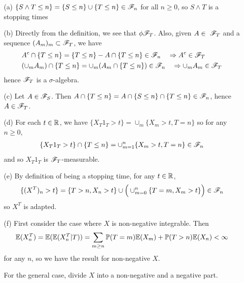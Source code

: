 \documentclass[10pt,a4paper]{report}
\newenvironment{proof}
{\begin{changemargin}{1cm}{0.5cm} 
	}%
	{\end{changemargin}
}
\begin{document}
\begin{proof}
\pf
\begin{itemize}
\item[(a)] $\{ S \wedge T \leq n \} = \{S  \leq n \} \cup \{ T \leq n\} \in \mathscr{F}_n$ for all $n\geq 0$, so $S\wedge T$ is a stopping times

\item[(b)] Directly from the definition, we see that $\phi \mathscr{F}_T$. Also, given $A\in \ \mathscr{F}_T$ and a sequence $(A_m)_m \subset \mathscr{F}_T$, we have
\begin{align*}
& A^c \cap \{T\leq n \} = \{T\leq n\} - A \cap \{T\leq n \} \in \mathscr{F}_n \quad \Rightarrow  A^c \in \mathscr{F}_T \\
&(\cup_m A_m) \cap \{T\leq n\} =  \cup_m (A_m \cap \{T\leq n\}) \in \mathscr{F}_n \quad \Rightarrow \cup_m A_m \in \mathscr{F}_T
\end{align*}
hence $\mathscr{F}_T$ is a $\sigma$-algebra.

\item[(c)] Let $A\in \mathscr{F}_S$. Then $A\cap \{T\leq n\} = A \cap \{S\leq n\} \cap \{T \leq n\} \in \mathscr{F}_n$, hence $A \in \mathscr{F}_T$.

\item[(d)] For each $t\in \mathbb{R}$, we have $\{X_T 1_T >t \} = \cup_m \{X_m >t, T=n \}$ so for any $n\geq 0$,
\begin{align*}
\{X_T 1_T >t \} \cap \{T\leq n\} = \cup_{m=1}^n \{X_m >t, T=n \} \in \mathscr{F}_n
\end{align*}
and so $X_T 1_T$ is $\mathscr{F}_T$-measurable.

\item[(e)] By definition of being a stopping time, for any $t\in \mathbb{R}$, 
\begin{align*}
\{(X^T)_n >t\} = \{T>n, X_n>t\} \cup \Big( \cup_{m=0}^n \{T=m, X_m>t \} \Big)\in \mathscr{F}_n
\end{align*}
so $X^T$ is adapted.

\item[(f)] First consider the case where $X$ is non-negative integrable. Then
\begin{align*}
\mathbb{E}(X^T_n) = \mathbb{E}(\mathbb{E}(X_n^T |T)) = \sum_{m\geq n} \mathbb{P}(T=m) \mathbb{E}(X_m) + \mathbb{P}(T>n) \mathbb{E}(X_n) < \infty
\end{align*}
for any $n$, so we have the result for non-negative $X$.

\quad For the general case, divide $X$ into a non-negative and a negative part.
\end{itemize}
\eop
\end{proof}
\s
\end{document}
